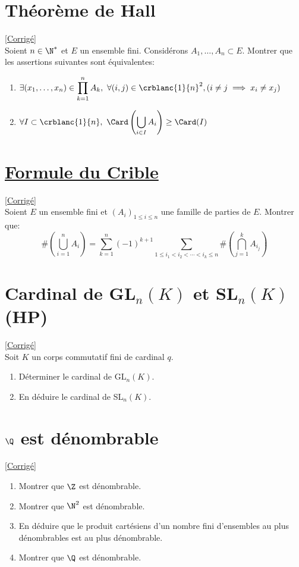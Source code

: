 \documentclass[8pt]{book}
\begin{document}
\section{Théorème de Hall }
\label{Théorème de Hall}
\textcolor{blue}{\hyperref[Théorème de Hall corrigé]{[Corrigé]}}\\
Soient $n\in \N^*$ et $E$ un ensemble fini. Considérons $A_1,\dots,A_n\subset E$. Montrer que les assertions suivantes sont équivalentes:
\begin{enumerate}[label=(\roman*)]
	\item $\exists (x_1,\dots,x_n)\in \displaystyle\prod_{k=1}^nA_k,\ \forall (i,j)\in \crblanc{1}{n}^2,(i\ne j\implies x_i\ne x_j)$
	\item $\forall I\subset \crblanc{1}{n},\ \Card\left(\displaystyle\bigcup\limits_{i\in I}{A_i}\right)\geq \Card(I)$
\end{enumerate}

\section{\underline{Formule du Crible} }
\label{Formule du crible}
\textcolor{blue}{\hyperref[Formule du crible corrigé]{[Corrigé]}}\\
Soient $E$ un ensemble fini et $(A_i)_{1\leq i\leq n}$ une famille de parties de $E$. Montrer que:
\\ $$\#\left(\bigcup_{i=1}^nA_i\right)=\sum _{k=1}^n(-1)^{k+1}\sum_{1\leq i_1<i_2<\cdots<i_k\leq n}\#\left(\bigcap_{j=1}^kA_{i_j}\right)$$

\section{Cardinal de GL$_n(K)$ et SL$_n(K)$  (HP)}
\label{Cardinal de GL_n et SL_n}
\textcolor{blue}{\hyperref[Cardinal de Gl_n et Sl_n corrigé]{[Corrigé]}}\\
Soit $K$ un corps commutatif fini de cardinal $q$.
\begin{enumerate}
	\item Déterminer le cardinal de GL$_n(K)$.
	\item En déduire le cardinal de SL$_n(K)$.
\end{enumerate}

\section{$\Q$ est dénombrable }
\label{Q est dénombrable}
\textcolor{blue}{\hyperref[Q est dénombrable corrigé]{[Corrigé]}}\\
\begin{enumerate}[leftmargin=*]
	\item Montrer que $\Z$ est dénombrable.
	\item Montrer que $\N^2$ est dénombrable.
	\item En déduire que le produit cartésiens d'un nombre fini d'ensembles au plus dénombrables est au plus dénombrable.
	\item Montrer que $\Q$ est dénombrable.
\end{enumerate}
\end{document}
